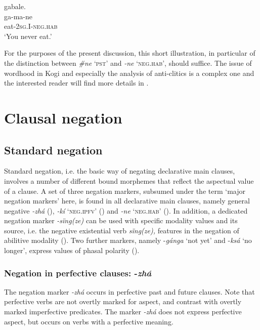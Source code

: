 \documentclass[output=paper,colorlinks,citecolor=brown]{langscibook}
\begin{document}
 \ea\label{ex:kog:4}gabale.\\
    \gll ga-ma-ne\\
         eat-2\textsc{sg.I-neg.hab}\\
    \glt  ‘You never eat.’
\z 

For the purposes of the present discussion, this short illustration, in particular of the distinction between \textit{\#ne} ‘\textsc{pst’} and \textit{{}-ne} ‘\textsc{neg.hab}’, should suffice. The issue of wordhood in Kogi and especially the analysis of anti-clitics is a complex one and the interested reader will find more details in \citet{Knuchel2022}.

\section{Clausal negation}\label{sec:kog:2}

\subsection{Standard negation}\label{sec:kog:2.1}

Standard negation, i.e. the basic way of negating declarative main clauses, involves a number of different bound morphemes that reflect the aspectual value of a clause. A set of three negation markers, subsumed under the term ‘major negation markers’ here, is found in all declarative main clauses, namely general negative \textit{{}-zhá} (), \textit{{}-kí} ‘\textsc{neg.ipfv}’
() and \textit{{}-ne} ‘\textsc{neg.hab}’ (). In addition, a dedicated negation marker \textit{{}-sïng(ze)} can be used with specific modality values and its source, i.e. the negative existential verb \textit{sïng(ze),} features in the negation of abilitive modality (). Two further markers, namely {}-\textit{gánga} ‘not yet’ and -\textit{ksá} ‘no longer’, express values of phasal polarity ().

\subsubsection{Negation in perfective clauses: -\textit{zhá}}\label{sec:kog:2.1.1}

The negation marker \textit{{}-zhá} occurs in perfective past and future clauses. Note that perfective verbs are not overtly marked for aspect, and contrast with overtly marked imperfective predicates. The marker \textit{{}-zhá} does not express perfective aspect, but occurs on verbs with a perfective meaning. 
\end{document}
